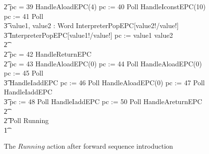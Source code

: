 \begin{figure}[t!]
{\begin{circus}
    \t2 {} \circelse pc = 39 \circthen HandleAloadEPC(4) \circseq pc := 40 \circseq Poll \circseq HandleIconstEPC(10) \circseq  pc := 41 \circseq Poll \circseq \\
    \t3 \circvar value1, value2 : Word \circspot \lschexpract InterpreterPopEPC[value2!/value!] \rschexpract \circseq \\
    \t3 \lschexpract InterpreterPopEPC[value1!/value!] \rschexpract \circseq pc := \IF value1 \leq value2   \\
    \t2 {} \cdots {} \\
    \t2 {} \circelse pc = 42 \circthen HandleReturnEPC \\
    \t2 {} \circelse pc = 43 \circthen HandleAloadEPC(0) \circseq pc := 44 \circseq Poll \circseq HandleAloadEPC(0) \circseq pc := 45 \circseq Poll \circseq \\
    \t3 HandleIaddEPC \circseq pc := 46 \circseq Poll \circseq HandleAloadEPC(0) \circseq pc := 47 \circseq Poll \circseq  HandleIaddEPC \circseq \\
    \t3 pc := 48 \circseq Poll \circseq HandleIaddEPC \circseq pc := 50 \circseq Poll \circseq HandleAreturnEPC \\
    \t2 {} \cdots {} \\
    \t2 \circfi \circseq Poll \circseq Running \\
    \t1 \circfi
  \end{circus}
  }
  \caption{The $Running$ action after forward sequence introduction}
  \label{forward-sequence-introduction-example-figure}
\end{figure}


